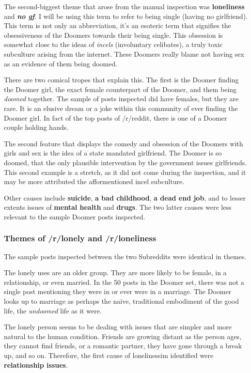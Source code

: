 \documentclass[../report.tex]{subfiles}
\begin{document}
The second-biggest theme that arose from the manual inspection was \textbf{loneliness} and \textbf{\textit{no gf}}. 
I will be using this term to refer to being single (having no girlfriend).
This term is not only an abbreviation, it's an esoteric term that signifies the obsessiveness of the Doomers towards their being single.
This obsession is somewhat close to the ideas of \textit{incels} (involuntary celibates), a truly toxic subculture arising from the internet. 
These Doomers really blame not having sex as an evidence of them being doomed. 

There are two comical tropes that explain this. 
The first is the Doomer finding the Doomer girl, the exact female counterpart of the Doomer, and them being \textit{doomed} together. 
The sample of posts inspected did have females, but they are rare. 
It is an elusive dream or a joke within this community of ever finding the Doomer girl. 
In fact of the top posts of /r/reddit, there is one of a Doomer couple holding hands. 

The second feature that displays the comedy and obsession of the Doomers with girls and sex is the idea of a state mandated girlfriend. 
The Doomer is so doomed, that the only plausible intervention by the government issues girlfriends. 
This second example is a stretch, as it did not come during the inspection, and it may be more attributed the afformentioned incel subculture. 

Other causes include \textbf{suicide}, \textbf{a bad childhood}, \textbf{a dead end job}, and to lesser extents issues of \textbf{mental health} and \textbf{drugs}. The two latter causes were less relevant to the sample Doomer posts inspected.

\subsubsection{Themes of /r/lonely and /r/loneliness}
The sample posts inspected between the two Subreddits were identical in themes. 


The lonely uses are an older group.
They are more likely to be female, in a relationship, or even married.
In the 50 posts in the Doomer set, there was not a single post mentioning they were in or ever were in a marriage. 
The Doomer looks up to marriage as perhaps the naive, traditional embodiment of the good life, the \textit{undoomed} life as it were. 

The lonely person seems to be dealing with issues that are simpler and more natural to the human condition. 
Friends are growing distant as the person ages, they cannot find friends, or a romantic partner, they have gone through a break up, and so on. 
Therefore, the first cause of lonelinessim identified were \textbf{relationship issues}.
\end{document}
